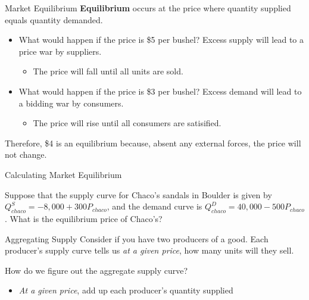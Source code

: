 \documentclass[12pt,t]{beamer}
\begin{document}
\begin{frame}{Market Equilibrium}
  \textbf{Equilibrium} occurs at the price where quantity supplied equals quantity demanded. 

  \pause
  \begin{itemize}
    \item What would happen if the price is \$5 per bushel? \pause Excess supply will lead to a price war by suppliers.
      \begin{itemize}
        \item The price will fall until all units are sold.
      \end{itemize}

    \pause 
    \item What would happen if the price is \$3 per bushel? \pause Excess demand will lead to a bidding war by consumers.
      \begin{itemize}
        \item The price will rise until all consumers are satisified.
      \end{itemize}
  \end{itemize}


  \pause 
  Therefore, \$4 is an equilibrium because, absent any external forces, the price will not change.
\end{frame}

\begin{frame}{Calculating Market Equilibrium}

\bigskip
Suppose that the supply curve for Chaco's sandals in Boulder is given by $Q^S_{chaco} = -8,000 + 300P_{chaco}$, and the demand curve is $Q^D_{chaco} = 40,000  - 500P_{chaco}$. What is the equilibrium price of Chaco's?

\end{frame}

\begin{frame}{Aggregating Supply}
  Consider if you have two producers of a good. Each producer's supply curve tells us \emph{at a given price}, how many units will they sell.

  \bigskip
  How do we figure out the aggregate supply curve? 
  
  \pause 
  \begin{itemize}
    \item \emph{At a given price}, add up each producer's quantity supplied
  \end{itemize}
\end{frame}
\end{document}
